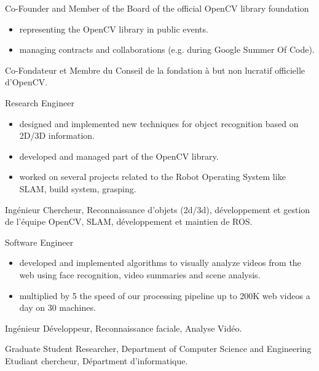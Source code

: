 \documentclass{article}
\begin{document}
\begin{llist}
{
Co-Founder and Member of the Board of the official OpenCV library foundation
\vspace{-0.33cm}
\begin{itemize}
 \item representing the OpenCV library in public events.
 \item managing contracts and collaborations (e.g. during Google Summer Of Code).
\end{itemize}
}
{
Co-Fondateur et Membre du Conseil de la fondation \`{a} but non lucratif officielle d'OpenCV.
}

{
Research Engineer
\vspace{-0.33cm}
\begin{itemize}
 \item designed and implemented new techniques for object recognition based on 2D/3D information.
 \item developed and managed part of the OpenCV library.
 \item worked on several projects related to the Robot Operating System like SLAM, build system, grasping.
\end{itemize}
}
{
Ing\'{e}nieur Chercheur, Reconnaissance d'objets (2d/3d), d\'{e}veloppement et gestion de l'\'{e}quipe 
OpenCV, SLAM, d\'{e}veloppement et maintien de ROS.
}

{
Software Engineer
\vspace{-0.33cm}
\begin{itemize}
 \item developed and implemented algorithms to visually analyze videos from the web using face recognition, video 
summaries and scene analysis.
 \item multiplied by 5 the speed of our processing pipeline up to 200K web videos a day on 30 machines.
\end{itemize}
}
{
Ing\'{e}nieur D\'{e}veloppeur, Reconnaissance faciale, Analyse
Vid\'{e}o.
}

{
Graduate Student Researcher, Department of Computer Science and Engineering
}
{
Etudiant chercheur, D\'{e}partment d'informatique.
}


\end{llist}
\end{document}
